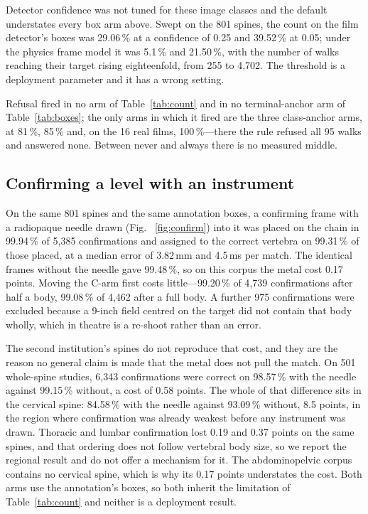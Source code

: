 \documentclass[11pt,letterpaper]{article}
\begin{document}
Detector confidence was not tuned for these image classes and the default understates every box arm
above. Swept on the 801 spines, the count on the film detector's boxes was 29.06\,\% at a confidence of
0.25 and 39.52\,\% at 0.05; under the physics frame model it was 5.1\,\% and 21.50\,\%, with the number
of walks reaching their target rising eighteenfold, from 255 to 4{,}702. The threshold is a deployment
parameter and it has a wrong setting.

Refusal fired in no arm of Table~\ref{tab:count} and in no terminal-anchor arm of Table~\ref{tab:boxes};
the only arms in which it fired are the three class-anchor arms, at 81\,\%, 85\,\% and, on the 16 real
films, 100\,\%---there the rule refused all 95 walks and answered none. Between never and always there is
no measured middle.

\subsection*{Confirming a level with an instrument}
On the same 801 spines and the same annotation boxes, a confirming frame with a radiopaque needle drawn
(Fig.~
\ref{fig:confirm})
into it was placed on the chain in 99.94\,\% of 5{,}385 confirmations and assigned to the correct vertebra
on 99.31\,\% of those placed, at a median error of 3.82\,mm and 4.5\,ms per match. The identical frames
without the needle gave 99.48\,\%, so on this corpus the metal cost 0.17 points. Moving the C-arm first
costs little---99.20\,\% of 4{,}739 confirmations after half a body, 99.08\,\% of 4{,}462 after a full
body. A further 975 confirmations were excluded because a 9-inch field centred on the target did not
contain that body wholly, which in theatre is a re-shoot rather than an error.

The second institution's spines do not reproduce that cost, and they are the reason no general claim is
made that the metal does not pull the match. On 501 whole-spine studies, 6{,}343 confirmations were
correct on 98.57\,\% with the needle against 99.15\,\% without, a cost of 0.58 points. The whole of that
difference sits in the cervical spine: 84.58\,\% with the needle against 93.09\,\% without, 8.5 points,
in the region where confirmation was already weakest before any instrument was drawn. Thoracic and
lumbar confirmation lost 0.19 and 0.37 points on the same spines, and that ordering does not follow
vertebral body size, so we report the regional result and do not offer a mechanism for it. The
abdominopelvic corpus contains no cervical spine, which is why its 0.17 points understates the cost.
Both arms use the annotation's boxes, so both inherit the limitation of Table~\ref{tab:count} and
neither is a deployment result.
\end{document}
